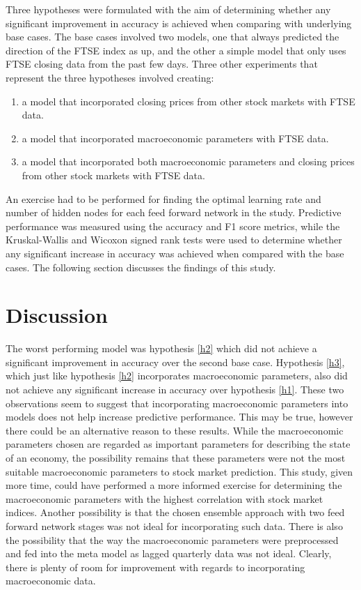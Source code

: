 \documentclass{UoYCSproject}
\begin{document}
Three hypotheses were formulated with the aim of determining whether any significant improvement in accuracy is achieved when comparing with underlying base cases. The base cases involved two models, one that always predicted the direction of the FTSE index as up, and the other a simple model that only uses FTSE closing data from the past few days. Three other experiments that represent the three hypotheses involved creating:
\begin{enumerate}
    \item a model that incorporated closing prices from other stock markets with FTSE data.
    \item a model that incorporated macroeconomic parameters with FTSE data.
    \item a model that incorporated both macroeconomic parameters and closing prices from other stock markets with FTSE data. 
\end{enumerate}

An exercise had to be performed for finding the optimal learning rate and number of hidden nodes for each feed forward network in the study. Predictive performance was measured using the accuracy and F1 score metrics, while the Kruskal-Wallis and Wicoxon signed rank tests were used to determine whether any significant increase in accuracy was achieved when compared with the base cases. The following section discusses the findings of this study.

\section{Discussion}
 The worst performing model was hypothesis \ref{h2} which did not achieve a significant improvement in accuracy over the second base case. Hypothesis \ref{h3}, which just like hypothesis \ref{h2} incorporates macroeconomic parameters, also did not achieve any significant increase in accuracy over hypothesis \ref{h1}. These two observations seem to suggest that incorporating macroeconomic parameters into models does not help increase predictive performance. This may be true, however there could be an alternative reason to these results. While the macroeconomic parameters chosen are regarded as important parameters for describing the state of an economy, the possibility remains that these parameters were not the most suitable macroeconomic parameters to stock market prediction. This study, given more time, could have performed a more informed exercise for determining the macroeconomic parameters with the highest correlation with stock market indices. Another possibility is that the chosen ensemble approach with two feed forward network stages was not ideal for incorporating such data. There is also the possibility that the way the macroeconomic parameters were preprocessed and fed into the meta model as lagged quarterly data was not ideal. Clearly, there is plenty of room for improvement with regards to incorporating macroeconomic data. 
\end{document}
